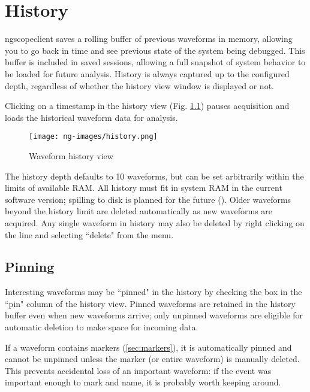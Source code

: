 \chapter{History}
\label{sec:history}

ngscopeclient saves a rolling buffer of previous waveforms in memory, allowing you to go back in time and see previous
state of the system being debugged. This buffer is included in saved sessions, allowing a full snapshot of system
behavior to be loaded for future analysis. History is always captured up to the configured depth, regardless of whether
the history view window is displayed or not.

Clicking on a timestamp in the history view (Fig. \ref{historyview}) pauses acquisition and loads the historical
waveform data for analysis.

\begin{figure}[H]
\centering
\texttt{[image: ng-images/history.png]}
\caption{Waveform history view}
\label{historyview}
\end{figure}

The history depth defaults to 10 waveforms, but can be set arbitrarily within the limits of available RAM. All history
must fit in system RAM in the current software version; spilling to disk is planned for the future
(). Older waveforms beyond the history limit are deleted automatically as new waveforms are
acquired. Any single waveform in history may also be deleted by right clicking on the line and selecting ``delete" from
the menu.


\section{Pinning}

Interesting waveforms may be ``pinned" in the history by checking the box in the ``pin" column of the history view.
Pinned waveforms are retained in the history buffer even when new waveforms arrive; only unpinned waveforms
are eligible for automatic deletion to make space for incoming data.

If a waveform contains markers (\ref{sec:markers}), it is automatically pinned and cannot be unpinned unless the marker
(or entire waveform) is manually deleted. This prevents accidental loss of an important waveform: if the event was
important enough to mark and name, it is probably worth keeping around.


